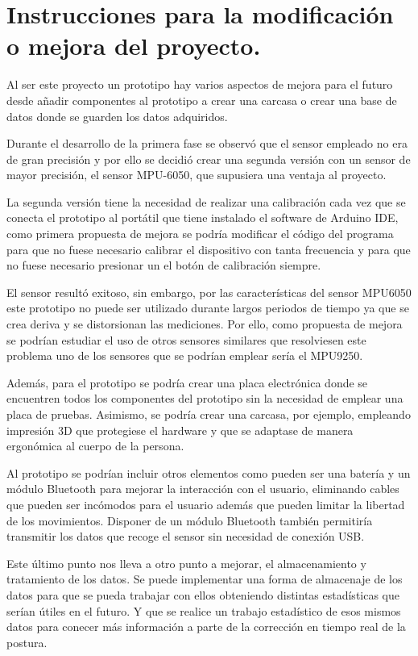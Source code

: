 \section{Instrucciones para la modificación o mejora del proyecto.}

Al ser este proyecto un prototipo hay varios aspectos de mejora para el futuro desde añadir componentes al prototipo a crear una carcasa o crear una base de datos donde se guarden los datos adquiridos.

Durante el desarrollo de la primera fase se observó que el sensor empleado no era de gran precisión y por ello se decidió crear una segunda versión con un sensor de mayor precisión, el sensor MPU-6050\cite{MPU6050_1,MPU6050_2}, que supusiera una ventaja al proyecto. 

La segunda versión tiene la necesidad de realizar una calibración cada vez que se conecta el prototipo al portátil que tiene instalado el software de Arduino IDE\cite{ArduinoIDE}, como primera propuesta de mejora se podría modificar el código del programa para que no fuese necesario calibrar el dispositivo con tanta frecuencia y para que no fuese necesario presionar un el botón de calibración siempre.

El sensor resultó exitoso, sin embargo, por las características del sensor MPU6050 este prototipo no puede ser utilizado durante largos periodos de tiempo ya que se crea deriva y se distorsionan las mediciones. Por ello, como propuesta de mejora se podrían estudiar el uso de otros sensores similares que resolviesen este problema uno de los sensores que se podrían emplear sería el MPU9250\cite{MPU9250_1,MPU9250_2}.

Además, para el prototipo se podría crear una placa electrónica donde se encuentren todos los componentes del prototipo sin la necesidad de emplear una placa de pruebas. Asimismo, se podría crear una carcasa, por ejemplo, empleando impresión 3D que protegiese el hardware y que se adaptase de manera ergonómica al cuerpo de la persona.

Al prototipo se podrían incluir otros elementos como pueden ser una batería y un módulo Bluetooth para mejorar la interacción con el usuario, eliminando cables que pueden ser incómodos para el usuario además que pueden limitar la libertad de los movimientos. Disponer de un módulo Bluetooth también permitiría transmitir los datos que recoge el sensor sin necesidad de conexión USB. 

Este último punto nos lleva a otro punto a mejorar, el almacenamiento y tratamiento de los datos. Se puede implementar una forma de almacenaje de los datos para que se pueda trabajar con ellos obteniendo distintas estadísticas que serían útiles en el futuro. Y que se realice un trabajo estadístico de esos mismos datos para conecer más información a parte de la corrección en tiempo real de la postura.
